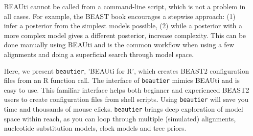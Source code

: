 \documentclass{article}
\begin{document}
BEAUti cannot be called from a command-line script, which is not a problem in all cases.
For example, the BEAST book \cite{drummond2015bayesian} encourages a stepwise approach: 
(1) infer a posterior from the simplest models possible, (2) while a posterior with a more complex model gives
a different posterior, increase complexity. This can be done manually using BEAUti and is the common workflow
when using a few alignments and doing a superficial search through model space.  

Here, we present \verb;beautier;, 'BEAUti for R', which 
creates BEAST2 configuration files from an R function call.
The interface of \verb;beautier; mimics BEAUti and is easy to use. This
familiar interface helps both beginner and experienced BEAST2 users 
to create configuration files from shell scripts.
Using \verb;beautier; will save you time and thousands of mouse clicks.
\verb;beautier; brings deep exploration of model space within reach,
as you can loop through multiple (simulated) alignments, 
nucleotide substitution models, clock models and tree priors.
\end{document}
